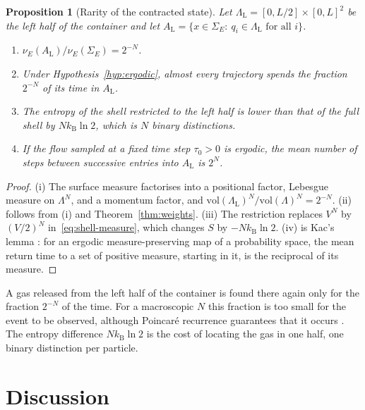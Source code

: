 \documentclass[11pt,a4paper]{article}
\newtheorem{proposition}[theorem]{Proposition}
\theoremstyle{definition}
\theoremstyle{remark}
\newcommand{\kB}{k_{\mathrm{B}}}
\begin{document}
\begin{proposition}[Rarity of the contracted state]
\label{prop:expansion}
Let $\Lambda_{\mathrm L}=[0,L/2]\times[0,L]^{2}$ be the left half of the container and let $A_{\mathrm L}=\{x\in\Sigma_E:\ q_i\in\Lambda_{\mathrm L}\text{ for all }i\}$.
\begin{enumerate}[label=(\roman*),leftmargin=2.2em]
\item $\nu_E(A_{\mathrm L})/\nu_E(\Sigma_E)=2^{-N}$.
\item Under Hypothesis~\ref{hyp:ergodic}, almost every trajectory spends the fraction $2^{-N}$ of its time in $A_{\mathrm L}$.
\item The entropy of the shell restricted to the left half is lower than that of the full shell by $N\kB\ln2$, which is $N$ binary distinctions.
\item If the flow sampled at a fixed time step $\tau_0>0$ is ergodic, the mean number of steps between successive entries into $A_{\mathrm L}$ is $2^{N}$.
\end{enumerate}
\end{proposition}

\begin{proof}
(i) The surface measure factorises into a positional factor, Lebesgue measure on $\Lambda^{N}$, and a momentum factor, and $\mathrm{vol}(\Lambda_{\mathrm L})^{N}/\mathrm{vol}(\Lambda)^{N}=2^{-N}$.
(ii) follows from (i) and Theorem~\ref{thm:weights}.
(iii) The restriction replaces $V^{N}$ by $(V/2)^{N}$ in~\eqref{eq:shell-measure}, which changes $S$ by $-N\kB\ln2$.
(iv) is Kac's lemma \citep{kac1947}: for an ergodic measure-preserving map of a probability space, the mean return time to a set of positive measure, starting in it, is the reciprocal of its measure.
\end{proof}

A gas released from the left half of the container is found there again only for the fraction $2^{-N}$ of the time.
For a macroscopic $N$ this fraction is too small for the event to be observed, although Poincar\'e recurrence guarantees that it occurs \citep{poincare1890}.
The entropy difference $N\kB\ln2$ is the cost of locating the gas in one half, one binary distinction per particle.

\section{Discussion}
\label{sec:discussion}
\end{document}
